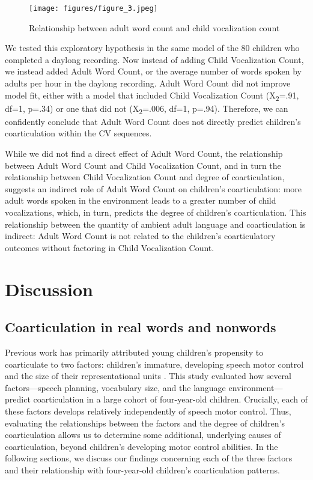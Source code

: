 \documentclass[a4paper,man,natbib,donotrepeattitle, apacite]{apa6}
\begin{document}
\begin{figure}[H]
\centering
\texttt{[image: figures/figure\_3.jpeg]}
\caption{\label{fig:figure-3}Relationship between adult word count and child vocalization count}
\end{figure}

We tested this exploratory hypothesis in the same model of the 80 children who completed a daylong recording. Now instead of adding Child Vocalization Count, we instead added Adult Word Count, or the average number of words spoken by adults per hour in the daylong recording. Adult Word Count did not improve model fit, either with a model that included Child Vocalization Count (X\textsubscript{2}=.91, df=1, p=.34) or one that did not (X\textsubscript{2}=.006, df=1, p=.94). Therefore, we can confidently conclude that Adult Word Count does not directly predict children’s coarticulation within the CV sequences.

While we did not find a direct effect of Adult Word Count, the relationship between Adult Word Count and Child Vocalization Count, and in turn the relationship between Child Vocalization Count and degree of coarticulation, suggests an indirect role of Adult Word Count on children’s coarticulation: more adult words spoken in the environment leads to a greater number of child vocalizations, which, in turn, predicts the degree of children’s coarticulation. This relationship between the quantity of ambient adult language and coarticulation is indirect: Adult Word Count is not related to the children’s coarticulatory outcomes without factoring in Child Vocalization Count.  

\section{Discussion}

\subsection{Coarticulation in real words and nonwords}

Previous work has primarily attributed young children’s propensity to coarticulate to two factors: children’s immature, developing speech motor control \cite{barbierWhatAnticipatoryCoarticulation2020,rubertusDevelopmentGesturalOrganization2018,zharkovaDynamicsVoicelessSibilant2018} and the size of their representational units \cite{nittrouerEmergencePhoneticSegments1989,nittrouerHowChildrenLearn1996,noiraySpokenLanguageDevelopment2019,zharkovaCoarticulationIndicatorSpeech2011}. This study evaluated how several factors---speech planning, vocabulary size, and the language environment---predict coarticulation in a large cohort of four-year-old children. Crucially, each of these factors develops relatively independently of speech motor control. Thus, evaluating the relationships between the factors and the degree of children’s coarticulation allows us to determine some additional, underlying causes of coarticulation, beyond children’s developing motor control abilities. In the following sections, we discuss our findings concerning each of the three factors and their relationship with four-year-old children’s coarticulation patterns. 
\end{document}

